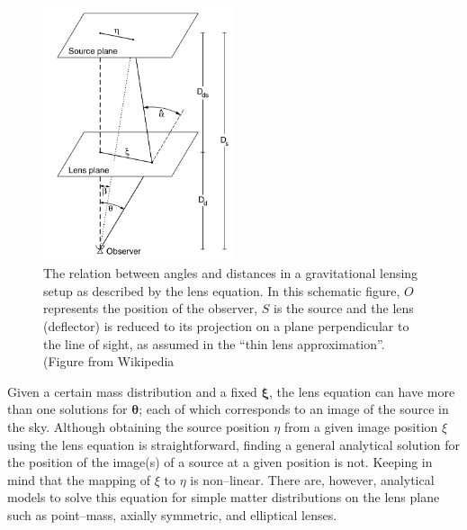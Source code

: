 \documentclass[paper=a4, fontsize=11pt]{scrartcl} %
\numberwithin{equation}{section} %
\numberwithin{figure}{section} %
\numberwithin{table}{section} %
\begin{document}
\begin{figure}[][t]
 \label{fig:config}
 \centering
\includegraphics[width=0.5\textwidth]{figs/Gravitational-lensing-angles}
 \caption{The relation between angles and distances in a gravitational lensing setup as described by the lens equation. In this schematic figure, $O$ represents the position of the observer, $S$ is the source and the lens (deflector) is reduced to its projection on a plane perpendicular to the line of sight, as assumed in the ``thin lens approximation''. (Figure from Wikipedia}
 \end{figure}

Given a certain mass distribution and a fixed $\boldsymbol \xi$, the lens equation can have more than one solutions for $\boldsymbol \theta$; each of which corresponds to an image of the source in the sky.  Although obtaining the source position $\eta$ from a given image position $\xi$ using the lens equation is straightforward, finding a general analytical solution for the position of the image(s) of a source at a given position is not. Keeping in mind that the mapping of $\xi$ to $\eta$ is non--linear. There are, however, analytical models to solve this equation for simple matter distributions on the lens plane such as point--mass, axially symmetric, and elliptical lenses.
\end{document}

